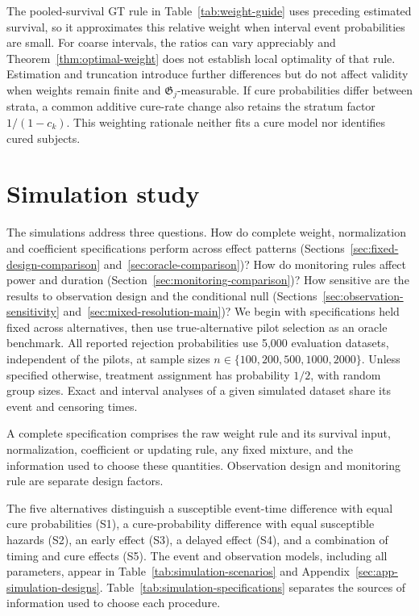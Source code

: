 \documentclass[12pt]{article}
\theoremstyle{definition}
\theoremstyle{remark}
\begin{document}
The pooled-survival GT rule in Table~\ref{tab:weight-guide} uses preceding estimated survival, so it approximates this relative weight when interval event probabilities are small. For coarse intervals, the ratios can vary appreciably and Theorem~\ref{thm:optimal-weight} does not establish local optimality of that rule. Estimation and truncation introduce further differences but do not affect validity when weights remain finite and $\mathfrak G_j$-measurable. If cure probabilities differ between strata, a common additive cure-rate change also retains the stratum factor $1/(1-c_k)$. This weighting rationale neither fits a cure model nor identifies cured subjects.

\section{Simulation study}
\label{sec:simulation}

The simulations address three questions. How do complete weight, normalization and coefficient specifications perform across effect patterns (Sections~\ref{sec:fixed-design-comparison} and~\ref{sec:oracle-comparison})? How do monitoring rules affect power and duration (Section~\ref{sec:monitoring-comparison})? How sensitive are the results to observation design and the conditional null (Sections~\ref{sec:observation-sensitivity} and~\ref{sec:mixed-resolution-main})? We begin with specifications held fixed across alternatives, then use true-alternative pilot selection as an oracle benchmark. All reported rejection probabilities use 5,000 evaluation datasets, independent of the pilots, at sample sizes $n\in\{100,200,500,1000,2000\}$. Unless specified otherwise, treatment assignment has probability $1/2$, with random group sizes. Exact and interval analyses of a given simulated dataset share its event and censoring times.

A complete specification comprises the raw weight rule and its survival input, normalization, coefficient or updating rule, any fixed mixture, and the information used to choose these quantities. Observation design and monitoring rule are separate design factors.

The five alternatives distinguish a susceptible event-time difference with equal cure probabilities (S1), a cure-probability difference with equal susceptible hazards (S2), an early effect (S3), a delayed effect (S4), and a combination of timing and cure effects (S5). The event and observation models, including all parameters, appear in Table~\ref{tab:simulation-scenarios} and Appendix~\ref{sec:app-simulation-designs}. Table~\ref{tab:simulation-specifications} separates the sources of information used to choose each procedure.
\end{document}
